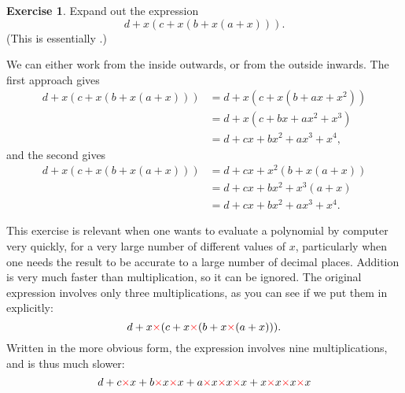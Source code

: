 \documentclass[a4paper]{book}
\theoremstyle{definition}
\newtheorem{exercise}[theorem]{Exercise}
\renewenvironment{solution}{\SolutionInline}{\endSolutionInline}
\begin{document}
\begin{exercise}
 Expand out the expression
 \[ d + x(c + x(b + x(a + x))). \]
 (This is essentially  .)
\end{exercise}
\begin{solution}
 We can either work from the inside outwards, or from the outside
 inwards.  The first approach gives
 \begin{align*}
  d + x(c + x(b + x(a + x))) &= d + x(c + x(b + ax + x^2)) \\
                             &= d + x(c + bx + ax^2 + x^3) \\
                             &= d + cx + bx^2 + ax^3 + x^4,
 \end{align*}
 and the second gives
 \begin{align*}
  d + x(c + x(b + x(a + x))) &= d + cx + x^2(b + x(a + x)) \\
                             &= d + cx + bx^2 + x^3(a + x) \\
                             &= d + cx + bx^2 + ax^3 + x^4.
 \end{align*}
\end{solution}
\begin{background}
 This exercise is relevant when one wants to evaluate a polynomial by
 computer very quickly, for a very large number of different values of
 $x$, particularly when one needs the result to be accurate to a large
 number of decimal places.  Addition is very much faster than
 multiplication, so it can be ignored.  The original expression
 involves only three multiplications, as you can see if we put them in
 explicitly:
 \[ d + x{\color{red}\mathbf{\times}}(c +
    x{\color{red}\mathbf{\times}}(b + x{\color{red}\mathbf{\times}}(a + x))).
 \]
 Written in the more obvious form, the expression involves nine
 multiplications, and is thus much slower:
 \[ d + c {\color{red}\mathbf{\times}} x +
    b{\color{red}\mathbf{\times}} x{\color{red}\mathbf{\times}} x +
    a{\color{red}\mathbf{\times}} x{\color{red}\mathbf{\times}} x{\color{red}\mathbf{\times}} x +
    x{\color{red}\mathbf{\times}} x{\color{red}\mathbf{\times}} x{\color{red}\mathbf{\times}} x
 \]
\end{background}
\end{document}
